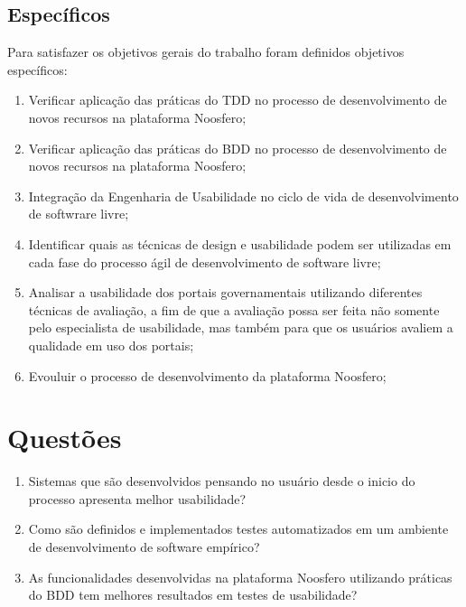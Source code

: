 	 
	 
	\subsection{Específicos}

	 Para satisfazer os objetivos gerais do trabalho foram definidos objetivos específicos:

	\begin{enumerate}
	\item Verificar aplicação das práticas do TDD no processo de desenvolvimento de novos recursos na plataforma Noosfero;
	\item Verificar aplicação das práticas do BDD no processo de desenvolvimento de novos recursos na plataforma Noosfero;
	\item Integração da Engenharia de Usabilidade no ciclo de vida de desenvolvimento de softwrare livre;
	\item Identificar quais as técnicas de design e usabilidade  podem ser utilizadas em cada fase do processo ágil de desenvolvimento de software livre;
	\item Analisar a usabilidade dos portais governamentais utilizando diferentes técnicas de avaliação, a fim de que a avaliação possa ser feita não somente pelo especialista de usabilidade, mas também para que os usuários avaliem a qualidade em uso dos portais;
	\item Evouluir o processo de desenvolvimento da plataforma Noosfero;
	\end{enumerate}

	\section{Questões}
	\begin{enumerate}
	\item Sistemas que são desenvolvidos pensando no usuário desde o inicio do processo apresenta melhor usabilidade?
	\item Como são definidos e implementados testes automatizados em um ambiente de desenvolvimento de software empírico?
	\item As funcionalidades desenvolvidas na plataforma Noosfero utilizando práticas do BDD tem melhores resultados em testes de usabilidade?

	\end{enumerate}
	 
